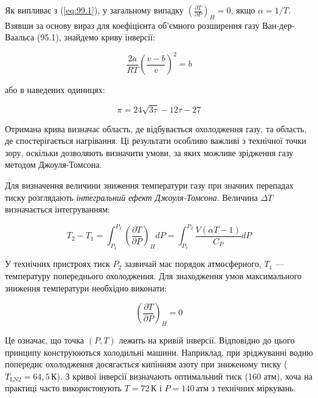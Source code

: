 \documentclass{article}
\begin{document}
Як випливає з (\ref{eq:99.1}), у загальному випадку $\left(\frac{\partial T}{\partial P}\right)_H =
0$, якщо $\alpha = 1/T$. Взявши за основу вираз для коефіцієнта об'ємного розширення газу
Ван-дер-Ваальса (95.1), знайдемо криву інверсії:

\begin{equation}
\frac{2a}{RT}\left(\frac{v - b}{v}\right)^2 = b
\label{eq:99.3}
\end{equation}

або в наведених одиницях:

\begin{equation}
\pi = 24\sqrt{3\tau} - 12\tau - 27
\label{eq:99.4}
\end{equation}

Отримана крива визначає область, де відбувається охолодження газу, та область, де спостерігається
нагрівання. Ці результати особливо важливі з технічної точки зору, оскільки дозволяють визначити
умови, за яких можливе зрідження газу методом Джоуля-Томсона.

Для визначення величини зниження температури газу при значних перепадах тиску розглядають
\emph{інтегральний ефект Джоуля-Томсона}. Величина $\Delta T$ визначається інтегруванням:

\begin{equation}
T_2 - T_1 = \int_{P_1}^{P_2} \left(\frac{\partial T}{\partial P}\right)_H dP = \int_{P_1}^{P_2}
\frac{V(\alpha T - 1)}{C_P} dP
\label{eq:99.5}
\end{equation}

У технічних пристроях тиск $P_2$ зазвичай має порядок атмосферного, $T_1$ — температуру попереднього
охолодження. Для знаходження умов максимального зниження температури необхідно виконати:

\begin{equation}
\left(\frac{\partial T}{\partial P}\right)_H = 0
\label{eq:99.6}
\end{equation}

Це означає, що точка $(P,T)$ лежить на кривій інверсії. Відповідно до цього принципу конструюються
холодильні машини. Наприклад, при зріджуванні водню попереднє охолодження досягається кипінням азоту
при зниженому тиску ($T_{\text{LN2}} = 64,5\,\text{К}$). З кривої інверсії визначають оптимальний тиск
(160 атм), хоча на практиці часто використовують $T = 72\,\text{К}$ і $P = 140\,\text{атм}$ з
технічних міркувань.
\end{document}
